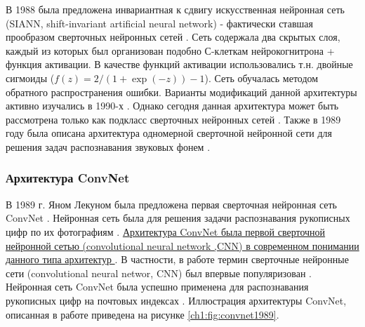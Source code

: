 \documentclass[12pt]{article}
\begin{document}
\begin{sloppypar}
В 1988 была предложена инвариантная к сдвигу искусственная нейронная сеть (SIANN, shift-invariant artificial neural network) - фактически ставшая прообразом сверточных нейронных сетей \cite{zhang1988shift}.  Сеть содержала два скрытых слоя, каждый из которых был организован подобно С-клеткам нейрокогнитрона + функция активации. В качестве функций активации использовались т.н. двойные сигмоиды ($f(z)= 2/(1+\exp(-z))-1$). Сеть обучалась методом обратного распространения ошибки. Варианты модификаций данной архитектуры активно изучались в 1990-х \cite{hasegawa1998shift}. Однако сегодня данная архитектура может быть рассмотрена только как подкласс сверточных нейронных сетей \cite{li2021survey}. Также в 1989 году была описана архитектура одномерной сверточной нейронной сети для решения задач распознавания звуковых фонем \cite{waibel1989phoneme}.

\subsubsection{Архитектура ConvNet} 
В 1989 г. Яном Лекуном была предложена первая сверточная нейронная сеть ConvNet \cite{lecun1989backpropagation}. Нейронная сеть была  для решения задачи распознавания рукописных цифр по их фотографиям \cite{lecun1989generalization}. 
\uline{Архитектура ConvNet была первой сверточной нейронной сетью (convolutional neural network ,CNN) в современном понимании данного типа архитектур 
}. 
В частности, в работе \cite{lecun1989generalization} термин сверточные нейронные сети (convolutional neural networ, CNN) был впервые популяризован \cite{li2021survey}.
Нейронная сеть ConvNet была успешно применена для распознавания рукописных цифр на почтовых индексах \cite{lecun1989backpropagation}. 
Иллюстрация архитектуры ConvNet, описанная в работе \cite{lecun1989backpropagation} приведена на рисунке \ref{ch1:fig:convnet1989}. 


\end{sloppypar}
\end{document}
